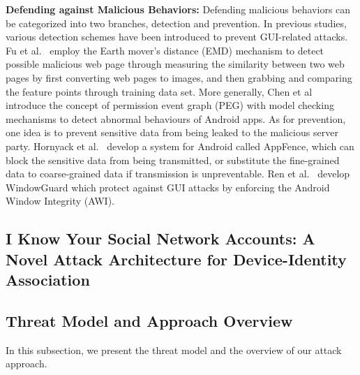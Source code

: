 \documentclass[letterpaper,12pt]{article}
\begin{document}
\textbf{Defending against Malicious Behaviors:} Defending malicious
behaviors can be categorized into two branches, detection and
prevention. In previous studies, various detection schemes have been
introduced to prevent GUI-related attacks. Fu
et al.~\cite{detectpswebsite} employ the Earth mover's distance (EMD)
mechanism to detect possible malicious web page through measuring the
similarity between two web pages by first converting web pages to
images, and then grabbing and comparing the feature points through
training data set. More generally, Chen et al~\cite{peg} introduce the
concept of permission event graph (PEG) with model checking mechanisms
to detect abnormal behaviours of Android apps. As for prevention, one
idea is to prevent sensitive data from being leaked to the malicious
server party. Hornyack et al.~\cite{AppFence} develop a
system for Android called AppFence, which can block the sensitive data
from being transmitted, or substitute the fine-grained data to
coarse-grained data if transmission is unpreventable. Ren
et al.~\cite{Windowguard} develop WindowGuard which protect against GUI
attacks by enforcing the Android Window Integrity (AWI).

   \newpage
   \begin{singlespace}
   \section{I Know Your Social Network Accounts: A Novel Attack Architecture for Device-Identity Association}
   \end{singlespace}
   \label{sec:dssnassociate}
   
   \subsection{Threat Model and Approach Overview}\label{sec:dssnthreatapproach}
   In this subsection, we present the threat model and the overview of our attack approach.
\end{document}
